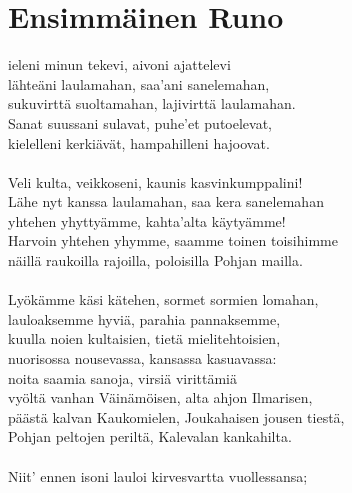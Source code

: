 %


%
\chapter*{Ensimmäinen Runo}

ieleni minun tekevi, aivoni ajattelevi                     \\
lähteäni laulamahan, saa'ani sanelemahan,				          	\\	
sukuvirttä suoltamahan, lajivirttä laulamahan.              \\
Sanat suussani sulavat, puhe'et putoelevat,                 \\
kielelleni kerkiävät, hampahilleni hajoovat.                \\
                                                            \\
Veli kulta, veikkoseni, kaunis kasvinkumppalini!            \\
Lähe nyt kanssa laulamahan, saa kera sanelemahan            \\
yhtehen yhyttyämme, kahta'alta käytyämme!                   \\
Harvoin yhtehen yhymme, saamme toinen toisihimme            \\
näillä raukoilla rajoilla, poloisilla Pohjan mailla.        \\
                                                            \\
Lyökämme käsi kätehen, sormet sormien lomahan,              \\
lauloaksemme hyviä, parahia pannaksemme,                    \\
kuulla noien kultaisien, tietä mielitehtoisien,             \\
nuorisossa nousevassa, kansassa kasuavassa:                 \\
noita saamia sanoja, virsiä virittämiä                      \\
vyöltä vanhan Väinämöisen, alta ahjon Ilmarisen,            \\
päästä kalvan Kaukomielen, Joukahaisen jousen tiestä,       \\
Pohjan peltojen periltä, Kalevalan kankahilta.              \\
                                                            \\
Niit' ennen isoni lauloi kirvesvartta vuollessansa;         \\
